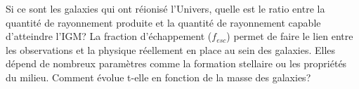 Si ce sont les galaxies qui ont réionisé l'Univers, quelle est le ratio entre la quantité de rayonnement produite et la quantité de rayonnement capable d'atteindre l'\ac{IGM}?
La fraction d'échappement ($f_{esc}$) permet de faire le lien entre les observations et la physique réellement en place au sein des galaxies.
Elles dépend de nombreux paramètres comme la formation stellaire ou les propriétés du milieu.
Comment évolue t-elle en fonction de la masse des galaxies? 


